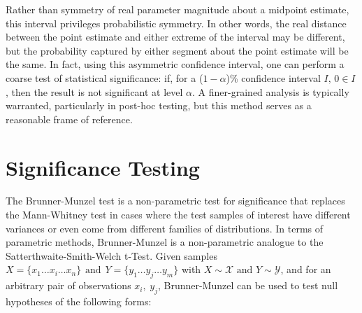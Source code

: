 \documentclass[pdflatex,sn-mathphys-num]{sn-jnl}
\theoremstyle{thmstyleone}
\theoremstyle{thmstyletwo}
\theoremstyle{thmstylethree}
\begin{document}
            \vspace{15pt}

            \par Rather than symmetry of real parameter magnitude about a midpoint estimate, this interval privileges probabilistic symmetry. In other words, the real distance between the point estimate and either extreme of the interval may be different, but the probability captured by either segment about the point estimate will be the same. In fact, using this asymmetric confidence interval, one can perform a coarse test of statistical significance: if, for a ($1 - \alpha$)\% confidence interval $I, \, 0 \in I$, then the result is not significant at level $\alpha$. A finer-grained analysis is typically warranted, particularly in post-hoc testing, but this method serves as a reasonable frame of reference.

        \vspace{10pt}

    \section{Significance Testing}

        The Brunner-Munzel test is a non-parametric test for significance that replaces the Mann-Whitney test in cases where the test samples of interest have different variances or even come from different families of distributions. In terms of parametric methods, Brunner-Munzel is a non-parametric analogue to the Satterthwaite-Smith-Welch t-Test. Given samples $X = \{ x_1 \dots x_i \dots x_n \} \hspace{1pt} \text{ and } \hspace{1pt} Y= \{ y_1 \dots y_j \dots y_m \}$ with $X \sim \mathcal{X} \text{ and } Y \sim \mathcal{Y}$, and for an arbitrary pair of observations $x_i, \hspace{3pt} y_j$, Brunner-Munzel can be used to test null hypotheses of the following forms:

        \vspace{10pt}
\end{document}
